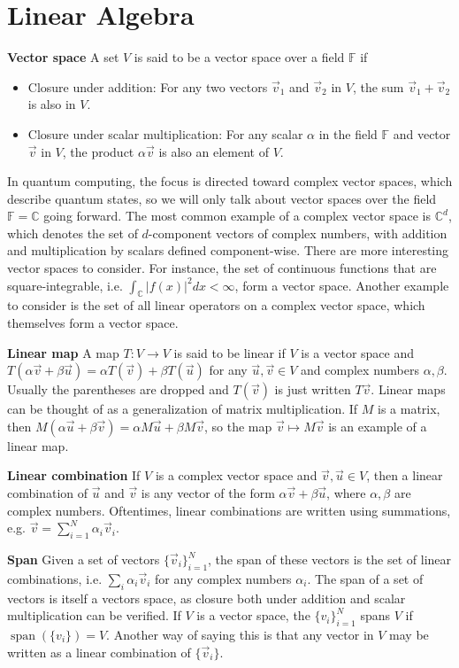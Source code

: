 \documentclass{article}
\begin{document}
\section{Linear Algebra}
\textbf{Vector space} A set $V$ is said to be a vector space over a field $\mathbb F$ if
\begin{itemize}
    \item Closure under addition: For any two vectors $\vec v_1$ and $\vec v_2$ in $V$, the sum $\vec v_1 + \vec v_2$ is also in $V$.
    \item Closure under scalar multiplication: For any scalar $\alpha$ in the field $\mathbb F$ and vector $\vec v$ in $V$, the product $\alpha \vec v$ is also an element of $V$.
\end{itemize}
In quantum computing, the focus is directed toward complex vector spaces, which describe quantum states, so we will only talk about vector spaces over the field $\mathbb F = \mathbb C$ going forward. The most common example of a complex vector space is $\mathbb C^d$, which denotes the set of $d$-component vectors of complex numbers, with addition and multiplication by scalars defined component-wise. There are more interesting vector spaces to consider. For instance, the set of continuous functions that are square-integrable, i.e. $\int_{\mathbb C}|f(x)|^2dx < \infty$, form a vector space. Another example to consider is the set of all linear operators on a complex vector space, which themselves form a vector space. 

\textbf{Linear map} A map $T:V \to V$ is said to be linear if $V$ is a vector space and $T(\alpha \vec v + \beta \vec u) = \alpha T(\vec v) + \beta T(\vec u)$ for any $\vec u, \vec v \in V$ and complex numbers $\alpha, \beta$. Usually the parentheses are dropped and $T(\vec v)$ is just written $T\vec v$. Linear maps can be thought of as a generalization of matrix multiplication. If $M$ is a matrix, then $M(\alpha \vec u + \beta \vec v) = \alpha  M \vec u + \beta M\vec v$, so the map $\vec v \mapsto M\vec v$ is an example of a linear map.

\textbf{Linear combination}
If $V$ is a complex vector space and $\vec v, \vec u \in V$, then a linear combination of $\vec u$ and $\vec v$ is any vector of the form $\alpha \vec v + \beta \vec u$, where $\alpha, \beta$ are complex numbers. Oftentimes, linear combinations are written using summations, e.g. $\vec v = \sum_{i=1}^N \alpha_i\vec v_i$.

\textbf{Span} Given a set of vectors $\{\vec v_i\}_{i=1}^N$, the span of these vectors is the set of linear combinations, i.e. $\sum_{i}\alpha_i\vec v_i$ for any complex numbers $\alpha_i$. The span of a set of vectors is itself a vectors space, as closure both under addition and scalar multiplication can be verified. If $V$ is a vector space, the $\{v_i\}_{i=1}^N$ spans $V$ if $\operatorname{span}(\{v_i\}) = V$. Another way of saying this is that any vector in $V$ may be written as a linear combination of $\{\vec v_i\}$.
\end{document}
